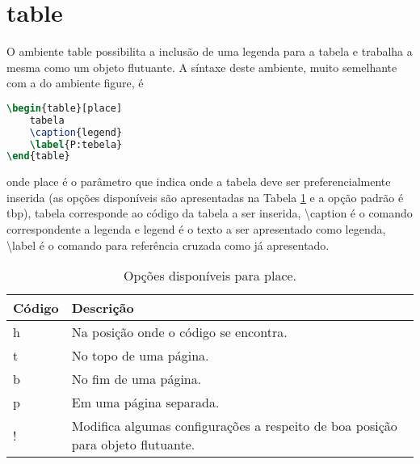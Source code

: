 \section{\textsf{table}}
O ambiente \textsf{table} possibilita a inclusão de uma legenda para a tabela e trabalha a mesma como um objeto flutuante. A síntaxe deste ambiente, muito semelhante com a do ambiente \textsf{figure}, é
\begin{lstlisting}[language=TeX]
\begin{table}[place]
    tabela
    \caption{legend}
    \label{P:tebela}
\end{table}
\end{lstlisting}
onde \textsf{place} é o parâmetro que indica onde a tabela deve ser preferencialmente inserida (as opções disponíveis são apresentadas na Tabela \ref{tab:par_place_tab} e a opção padrão é \textsf{tbp}), \textsf{tabela} corresponde ao código da tabela a ser inserida, \textbackslash\textsf{caption} é o comando correspondente a legenda e \textsf{legend} é o texto a ser apresentado como legenda, \textbackslash\textsf{label} é o comando para referência cruzada como já apresentado.
\begin{table}[!htb]
    \centering
    \caption{Opções disponíveis para \textsf{place}.}
    \label{tab:par_place_tab}
    \begin{tabular}{lp{}}
        \hline
        Código & Descrição \\ \hline
        \textsf{h} & Na posição onde o código se encontra. \\
        \textsf{t} & No topo de uma página. \\
        \textsf{b} & No fim de uma página. \\
        \textsf{p} & Em uma página separada. \\
        \textsf{!} & Modifica algumas configurações a respeito de boa posição para objeto flutuante. \\ \hline
    \end{tabular}
\end{table}

